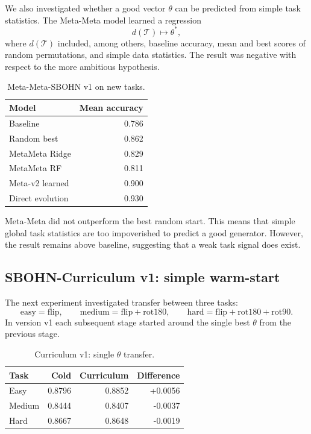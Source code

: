 \documentclass[11pt,a4paper]{report}
\begin{document}
We also investigated whether a good vector \(\theta\) can be predicted from simple task
statistics. The Meta-Meta model learned a regression
\[
  d(\mathcal{T}) \mapsto \theta^*,
\]
where \(d(\mathcal{T})\) included, among others, baseline accuracy, mean and best scores
of random permutations, and simple data statistics. The result was negative with respect
to the more ambitious hypothesis.

\begin{table}[h]
\centering
\caption{Meta-Meta-SBOHN v1 on new tasks.}
\begin{tabular}{l r}
\hline
Model & Mean accuracy \\
\hline
Baseline & 0.786 \\
Random best & 0.862 \\
MetaMeta Ridge & 0.829 \\
MetaMeta RF & 0.811 \\
Meta-v2 learned & 0.900 \\
Direct evolution & 0.930 \\
\hline
\end{tabular}
\end{table}

Meta-Meta did not outperform the best random start. This means that simple global
task statistics are too impoverished to predict a good generator. However, the result
remains above baseline, suggesting that a weak task signal does exist.

\subsection{SBOHN-Curriculum v1: simple warm-start}

The next experiment investigated transfer between three tasks:
\[
  \text{easy}=\text{flip},\qquad
  \text{medium}=\text{flip}+\text{rot180},\qquad
  \text{hard}=\text{flip}+\text{rot180}+\text{rot90}.
\]
In version v1 each subsequent stage started around the single best \(\theta\) from the
previous stage.

\begin{table}[h]
\centering
\caption{Curriculum v1: single \(\theta\) transfer.}
\begin{tabular}{l r r r}
\hline
Task & Cold & Curriculum & Difference \\
\hline
Easy & 0.8796 & 0.8852 & +0.0056 \\
Medium & 0.8444 & 0.8407 & -0.0037 \\
Hard & 0.8667 & 0.8648 & -0.0019 \\
\hline
\end{tabular}
\end{table}
\end{document}
